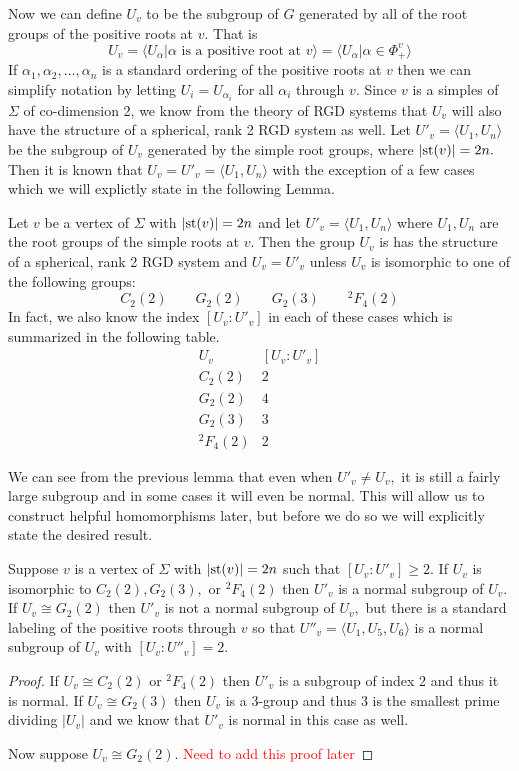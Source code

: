 \documentclass[class=book, crop=false,12 pt]{standalone}
\begin{document}
Now we can define $U_v$ to be the subgroup of $G$ generated by all of the root groups of the positive roots at $v.$ That is
\[
U_v=\langle U_\alpha|\alpha \text{ is a positive root at }v\rangle=\langle U_\alpha|\alpha\in \Phi_+^v\rangle
\]
If $\alpha_1,\alpha_2,\dots,\alpha_n$ is a standard ordering of the positive roots at $v$ then we can simplify notation by letting $U_i=U_{\alpha_i}$ for all $\alpha_i$ through $v.$ Since $v$ is a simples of $\Sigma$ of co-dimension 2, we know from the theory of RGD systems that $U_v$ will also have the structure of a spherical, rank 2 RGD system as well. Let $U'_v=\langle U_1,U_n\rangle$ be the subgroup of $U_v$ generated by the simple root groups, where $|\mathrm{st}(v)|=2n.$ Then it is known that $U_v=U'_v=\langle U_1,U_n\rangle$ with the exception of a few cases which we will explictly state in the following Lemma.

\begin{lemma}
	\label{lem:index}
	Let $v$ be a vertex of $\Sigma$ with $|\mathrm{st}(v)|=2n$ and let $U'_v=\langle U_1,U_n\rangle$ where $U_1,U_n$ are the root groups of the simple roots at $v.$ Then the group $U_v$ is has the structure of a spherical, rank 2 RGD system and $U_v=U'_v$ unless $U_v$ is isomorphic to one of the following groups:
	\[
		C_2(2)\qquad G_2(2) \qquad G_2(3) \qquad {}^2F_4(2)
	\]
	In fact, we also know the index $[U_v:U'_v]$ in each of these cases which is summarized in the following table.
	\[
		\begin{array}{c|c}
			U_v&[U_v:U'_v]\\\hline
			C_2(2)&2\\
			G_2(2)&4\\
			G_2(3)&3\\
			{}^2F_4(2)&2
		\end{array}
	\]
\end{lemma}

We can see from the previous lemma that even when $U'_v\neq U_v,$ it is still a fairly large subgroup and in some cases it will even be normal. This will allow us to construct helpful homomorphisms later, but before we do so we will explicitly state the desired result.

\begin{lemma}
	\label{lem:normal}
	Suppose $v$ is a vertex of $\Sigma$ with $|\mathrm{st}(v)|=2n$ such that $[U_v:U'_v]\ge 2.$ If $U_v$ is isomorphic to $C_2(2), G_2(3),$ or ${}^2F_4(2)$ then $U'_v$ is a normal subgroup of $U_v.$ If $U_v\cong G_2(2)$ then $U'_v$ is not a normal subgroup of $U_v,$ but there is a standard labeling of the positive roots through $v$ so that $U''_v=\langle U_{1},U_{5},U_{6}\rangle$ is a normal subgroup of $U_v$ with $[U_v:U''_v]=2.$
\end{lemma}
\begin{proof}
	If $U_v\cong C_2(2)$ or ${}^2F_4(2)$ then $U'_v$ is a subgroup of index 2 and thus it is normal. If $U_v\cong G_2(3)$ then $U_v$ is a 3-group and thus $3$ is the smallest prime dividing $|U_v|$ and we know that $U'_v$ is normal in this case as well.

	Now suppose $U_v\cong G_2(2).$ \textcolor{red}{\Huge Need to add this proof later\normalsize}
\end{proof}
\end{document}

